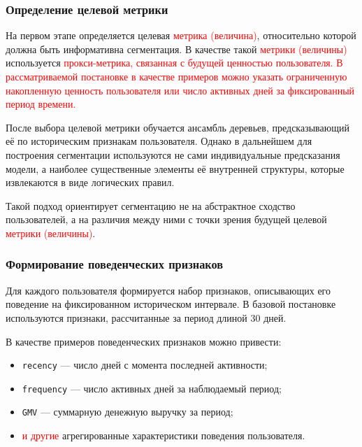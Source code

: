 \subsubsection{Определение целевой метрики}
\label{subsubsec:target_definition}

На первом этапе определяется целевая \textcolor{red}{метрика (величина)}, относительно которой
должна быть информативна сегментация. В качестве такой \textcolor{red}{метрики (величины)}
используется \textcolor{red}{прокси-метрика, связанная с будущей ценностью пользователя.
В рассматриваемой постановке в качестве примеров можно указать
ограниченную накопленную ценность пользователя или число активных дней
за фиксированный период времени.}

После выбора целевой метрики обучается ансамбль деревьев,
предсказывающий её по историческим признакам пользователя. Однако
в дальнейшем для построения сегментации используются не сами индивидуальные
предсказания модели, а наиболее существенные элементы её внутренней
структуры, которые извлекаются в виде логических правил.

Такой подход ориентирует сегментацию не на абстрактное сходство
пользователей, а на различия между ними с точки зрения будущей
целевой \textcolor{red}{метрики (величины)}.

\subsubsection{Формирование поведенческих признаков}
\label{subsubsec:feature_engineering}

Для каждого пользователя формируется набор признаков, описывающих его
поведение на фиксированном историческом интервале. В базовой
постановке используются признаки, рассчитанные за период длиной
30 дней.

В качестве примеров поведенческих признаков можно привести:
\begin{itemize}
    \item \texttt{recency} — число дней с момента последней активности;
    \item \texttt{frequency} — число активных дней за наблюдаемый период;
    \item \texttt{GMV} — суммарную денежную выручку за период;
    \item \textcolor{red}{ и другие} агрегированные характеристики поведения пользователя.
\end{itemize}

